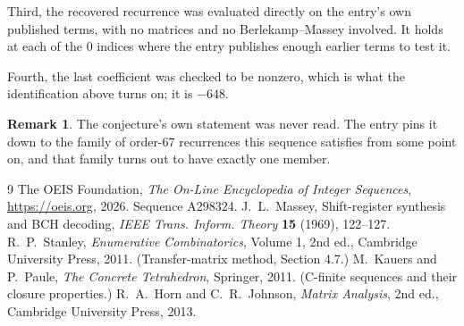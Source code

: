 \documentclass[11pt,a4paper]{article}
\theoremstyle{plain}
\theoremstyle{definition}
\newtheorem{remark}[theorem]{Remark}
\begin{document}
Third, the recovered recurrence was evaluated directly on the entry's own published terms, with
no matrices and no Berlekamp--Massey involved. It holds at each of the $0$ indices where
the entry publishes enough earlier terms to test it.

Fourth, the last coefficient was checked to be nonzero, which is what the identification above
turns on; it is $-648$.

\begin{remark}
The conjecture's own statement was never read. The entry pins it down to the family of
order-$67$ recurrences this sequence satisfies from some point on, and that family turns
out to have exactly one member.
\end{remark}

\begin{thebibliography}{9}
 The OEIS Foundation, \emph{The On-Line Encyclopedia of Integer
Sequences}, \url{https://oeis.org}, 2026. Sequence A298324.
 J.~L.~Massey, Shift-register synthesis and BCH decoding, \emph{IEEE
Trans. Inform. Theory} \textbf{15} (1969), 122--127.
 R.~P.~Stanley, \emph{Enumerative Combinatorics}, Volume 1, 2nd ed.,
Cambridge University Press, 2011. (Transfer-matrix method, Section 4.7.)
 M.~Kauers and P.~Paule, \emph{The Concrete Tetrahedron}, Springer, 2011.
(C-finite sequences and their closure properties.)
 R.~A.~Horn and C.~R.~Johnson, \emph{Matrix Analysis}, 2nd ed., Cambridge
University Press, 2013.
\end{thebibliography}
\end{document}
